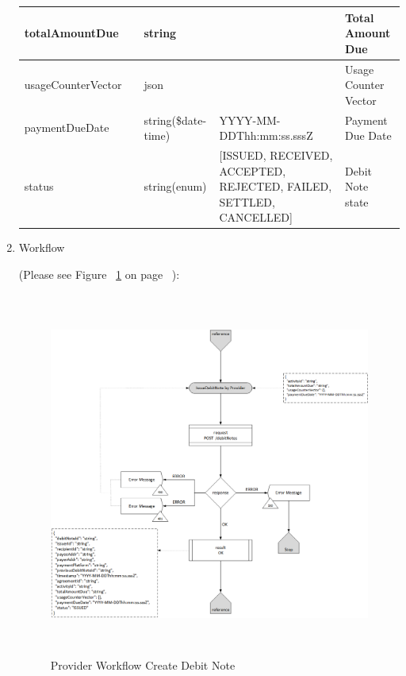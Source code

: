 \begin{enumerate}
\begin{table}[H]
\begin{center}
\begin{tabular}{|p{3cm}|l|p{3cm}|p{3cm}|p{4cm}|}
totalAmountDue			& 	& 	string				&																		&	Total Amount Due \\ 
\hline

usageCounterVector		&   & 	json				&																		&	Usage Counter Vector \\
\hline

paymentDueDate			&   &	string(\$date-time)	&	YYYY-MM-DDThh:mm:ss.sssZ											&	Payment Due Date \\
\hline

status					&	&	string(enum)		&	[ISSUED, RECEIVED, ACCEPTED, REJECTED, FAILED, SETTLED, CANCELLED]	& 	Debit Note state \\	
\hline

\end{tabular}
\end{center}
\end{table}

\item Workflow

(Please see Figure ~\ref{fig:PCDN} on page ~\pageref{fig:PCDN}):

\begin{figure}[htbp]
    \centering
    \includegraphics[width=12cm,height=12cm,angle=0]{./diag/Workflow/Payment/IssueDebitNote-P-Workflow.png}
    \caption{Provider Workflow Create Debit Note }
	\label{fig:PCDN}
\end{figure}


\end{enumerate}

